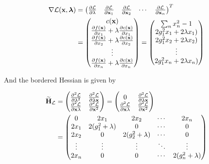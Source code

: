 \documentclass{article}
\newcommand{\Lagr}{\mathcal{L}}
\newcommand{\vect}[1]{\textbf{\textrm{#1}}}
\newcommand{\pd}[2]{\frac{\partial {#1}}{\partial {#2}}}
\newcommand{\pdd}[2]{\frac{\partial^2 {#1}}{\partial {#2}}}
\begin{document}
\begin{align}
	\nabla \Lagr(\vect{x},\bm{\lambda}) & = 
	\begin{pmatrix}
		\pd{\Lagr}{\lambda} & \pd{\Lagr}{\vect{x}_1} & \pd{\Lagr}{\vect{x}_2} 
		& \cdots & \pd{\Lagr}{\vect{x}_n}
	\end{pmatrix}^{T} \\
	& = 
	\begin{pmatrix}
		c(\vect{x}) \\
		\pd{f(\vect{x})}{x_1} + \lambda \pd{c(\vect{x})}{x_1} \\
		\pd{f(\vect{x})}{x_2} + \lambda \pd{c(\vect{x})}{x_2}	\\	
		\vdots \\
		\pd{f(\vect{x})}{x_n} + \lambda \pd{c(\vect{x})}{x_n}
	\end{pmatrix} = 
	\begin{pmatrix}
		\sum_n{x_n^2} - 1 \\
		2 g_1^2 x_1 + 2 \lambda x_1) \\
		2 g_1^2 x_2 + 2 \lambda x_2) \\
		\vdots \\
		2 g_1^2 x_n + 2 \lambda x_n)
	\end{pmatrix} \nonumber
\end{align}

And the bordered Hessian is given by

\begin{align}
	\widetilde{\vect{H}}_\Lagr & = 
	\begin{pmatrix}
		\pdd{\Lagr}{\lambda^2} & \pdd{\Lagr}{\lambda\vect{x}} \\
		\pdd{\Lagr}{\vect{x}\lambda} & \pdd{\Lagr}{\vect{x}^2}
	\end{pmatrix} = 
	\begin{pmatrix}
		0 & \pdd{\Lagr}{\lambda\vect{x}} \\
		\pdd{\Lagr}{\vect{x}\lambda} & \pdd{\Lagr}{\vect{x}^2}
	\end{pmatrix} \\
	& = 
	\begin{pmatrix}
		0 & 2x_1 & 2x_2 & \cdots & 2x_n \\
		2x_1 & 2 (g_1^2 + \lambda) & 0 & \cdots & 0 \\
		2x_2 & 0 & 2 (g_2^2 + \lambda) & \cdots & 0 \\
		\vdots & \vdots & \vdots & \ddots & \vdots \\
		2x_n & 0 & 0 & \cdots & 2 (g_n^2 + \lambda)
	\end{pmatrix} \nonumber
\end{align}
\end{document}

